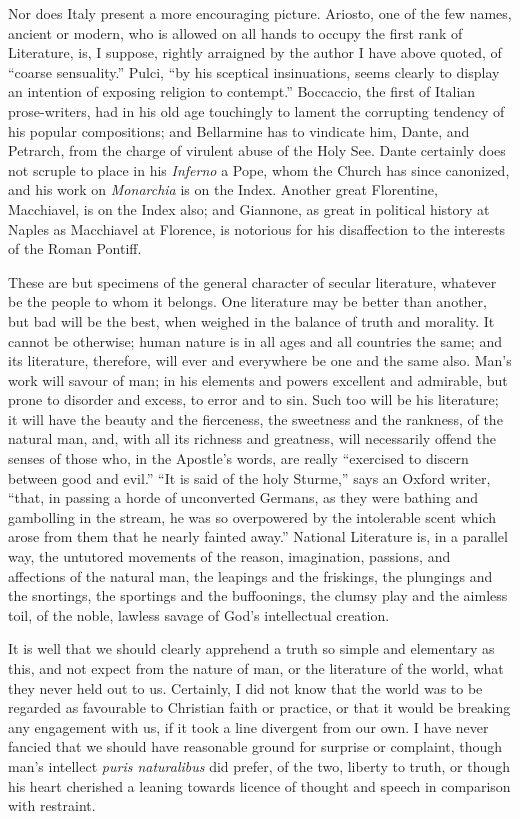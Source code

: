 Nor does Italy present a more encouraging picture. Ariosto, one of
the few names, ancient or modern, who is allowed on all hands to
occupy the first rank of Literature, is, I suppose, rightly arraigned
by the author I have above quoted, of ``coarse sensuality.''
Pulci, ``by his sceptical insinuations, seems clearly to display
an intention of exposing religion to contempt.'' Boccaccio, the
first of Italian prose-writers, had in his old age touchingly to
lament the corrupting tendency of his popular compositions; and
Bellarmine has to vindicate him, Dante, and Petrarch, from the charge
of virulent abuse of the Holy See. Dante certainly does not scruple to
place in his \emph{Inferno} a Pope, whom the Church has since
canonized, and his work on \emph{Monarchia} is on the Index. Another
great Florentine, Macchiavel, is on the Index also; and Giannone, as
great in political history at Naples as Macchiavel at Florence, is
notorious for his disaffection to the interests of the Roman Pontiff.

These are but specimens of the general character of secular
literature, whatever be the people to whom it belongs. One literature
may be better than another, but bad will be the best, when weighed in
the balance of truth and morality. It cannot be otherwise; human
nature is in all ages and all countries the same; and its literature,
therefore, will ever and everywhere be one and the same also. Man's
work will savour of man; in his elements and powers excellent and
admirable, but prone to disorder and excess, to error and to sin. Such
too will be his literature; it will have the beauty and the
fierceness, the sweetness and the rankness, of the natural man, and,
with all its richness and greatness, will necessarily offend the
senses of those who, in the Apostle's words, are really
``exercised to discern between good and evil.'' ``It is
said of the holy Sturme,'' says an Oxford writer, ``that, in
passing a horde of unconverted Germans, as they were bathing and
gambolling in the stream, he was so overpowered by the intolerable
scent which arose from them that he nearly fainted away.''
National Literature is, in a parallel way, the untutored movements of
the reason, imagination, passions, and affections of the natural man,
the leapings and the friskings, the plungings and the snortings, the
sportings and the buffoonings, the clumsy play and the aimless toil,
of the noble, lawless savage of God's intellectual creation.

It is well that we should clearly apprehend a truth so simple and
elementary as this, and not expect from the nature of man, or the
literature of the world, what they never held out to us. Certainly, I
did not know that the world was to be regarded as favourable to
Christian faith or practice, or that it would be breaking any
engagement with us, if it took a line divergent from our own. I have
never fancied that we should have reasonable ground for surprise or
complaint, though man's intellect \emph{puris naturalibus} did prefer,
of the two, liberty to truth, or though his heart cherished a leaning
towards licence of thought and speech in comparison with restraint.

